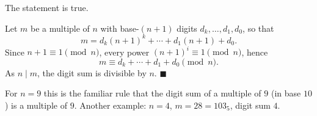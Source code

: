 The statement is true.

Let $m$ be a multiple of $n$ with base-$(n+1)$ digits $d_k,\dots,d_1,d_0$, so that
\[m=d_k(n+1)^k+\cdots+d_1(n+1)+d_0.\]
Since $n+1\equiv1\pmod n$, every power $(n+1)^i\equiv1\pmod n$, hence
\[m\equiv d_k+\cdots+d_1+d_0\pmod n.\]
As $n\mid m$, the digit sum is divisible by $n$. $\blacksquare$

For $n=9$ this is the familiar rule that the digit sum of a multiple of $9$ (in base $10$) is a multiple of $9$. Another example: $n=4$, $m=28=103_5$, digit sum $4$.
